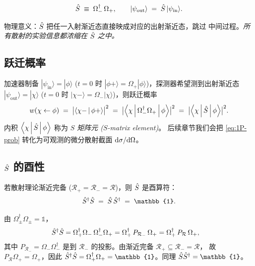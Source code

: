 \begin{definition}
\label{def:1P-S}
\begin{equation}
  \hat{S} \;\equiv\; \Omega_-^{\dagger}\,\Omega_+,\qquad
  |\psi_{\text{out}}\rangle \;=\; \hat{S}\,|\psi_{\text{in}}\rangle.
  \label{eq:1P-S-def}
\end{equation}
\end{definition}

物理意义：$\hat{S}$ 把任一入射渐近态直接映成对应的出射渐近态，跳过
中间过程。\emph{所有散射的实验信息都浓缩在 $\hat{S}$ 之中。}

\subsection{跃迁概率}

加速器制备 $|\psi_{\text{in}}\rangle=|\phi\rangle$ ($t=0$ 时
$|\phi+\rangle=\Omega_+|\phi\rangle$)，探测器希望测到出射渐近态
$|\psi_{\text{out}}\rangle=|\chi\rangle$ ($t=0$ 时
$|\chi-\rangle=\Omega_-|\chi\rangle$)，则跃迁概率
\begin{equation}
  w(\chi\leftarrow\phi) \;=\;
   \bigl|\left\langle \chi- \,\middle|\, \phi+ \right\rangle\bigr|^2
   \;=\; \bigl|\left\langle \chi \,\middle|\, \Omega_-^{\dagger}\Omega_+ \,\middle|\, \phi \right\rangle\bigr|^2
   \;=\; \bigl|\left\langle \chi \,\middle|\, \hat{S} \,\middle|\, \phi \right\rangle\bigr|^2 .
  \label{eq:1P-prob}
\end{equation}
内积 $\left\langle \chi \,\middle|\, \hat{S} \,\middle|\, \phi \right\rangle$ 称为 \emph{$S$ 矩阵元 ($S$-matrix element)}。
后续章节我们会把 \eqref{eq:1P-prob} 转化为可观测的微分散射截面
${\mathrm{d}\sigma}/{\mathrm{d}\Omega}$。

\subsection{$\hat{S}$ 的酉性}
\label{ssec:1P-unitarity}

\begin{theorem}[Unitarity]
\label{thm:1P-unitarity}
若散射理论渐近完备 ($\mathcal{R}_+=\mathcal{R}_-=\mathcal{R}$)，则
$\hat{S}$ 是酉算符：
\begin{equation}
  \Smat^{\dagger}\Smat \;=\; \Smat\,\Smat^{\dagger} \;=\; \mathbb{1}.
  \label{eq:1P-unitary}
\end{equation}
\end{theorem}

\begin{proof*}
由 $\Omega_\pm^{\dagger}\Omega_\pm=\mathbb{1}$，
\begin{align*}
  \hat{S}^{\dagger}\hat{S}
  &= \Omega_+^{\dagger}\Omega_-\,\Omega_-^{\dagger}\Omega_+
  = \Omega_+^{\dagger}\,P_{\mathcal{R}_-}\,\Omega_+
  = \Omega_+^{\dagger}\,P_{\mathcal{R}}\,\Omega_+,
\end{align*}
其中 $P_{\mathcal{R}_-}=\Omega_-\Omega_-^{\dagger}$ 是到 $\mathcal{R}_-$
的投影。由渐近完备 $\mathcal{R}_+ \subseteq\mathcal{R}_-=\mathcal{R}$，
故 $P_{\mathcal{R}}\Omega_+ = \Omega_+$，因此
$\Smat^{\dagger}\Smat = \Omega_+^{\dagger}\Omega_+=\mathbb{1}$。同理
$\Smat\Smat^{\dagger}=\mathbb{1}$。
\end{proof*}

